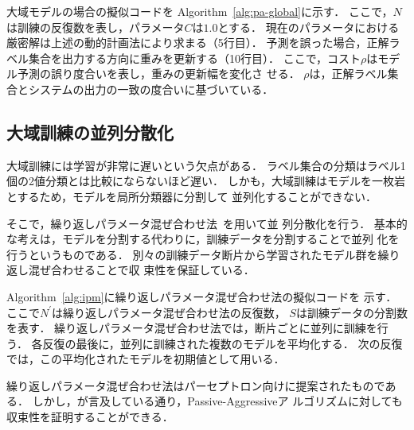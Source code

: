 \documentclass[japanese]{jnlp_1.4}
\begin{document}
大域モデルの場合の擬似コードを Algorithm~\ref{alg:pa-global}に示す．
ここで，$N$は訓練の反復数を表し，パラメータ$C$は$1.0$とする．
現在のパラメータにおける厳密解は上述の動的計画法により求まる（5行目）．
予測を誤った場合，正解ラベル集合を出力する方向に重みを更新する（10行目）．
ここで，コスト$\rho$はモデル予測の誤り度合いを表し，重みの更新幅を変化さ
せる．
$\rho$は，正解ラベル集合とシステムの出力の一致の度合いに基づいている．



\subsection{大域訓練の並列分散化}
\label{sec:proposed-parallel}

大域訓練には学習が非常に遅いという欠点がある．
ラベル集合の分類はラベル1個の2値分類とは比較にならないほど遅い．
しかも，大域訓練はモデルを一枚岩とするため，モデルを局所分類器に分割して
並列化することができない．

そこで，繰り返しパラメータ混ぜ合わせ法~\cite{McDonald2010full}を用いて並
列分散化を行う．
基本的な考えは，モデルを分割する代わりに，訓練データを分割することで並列
化を行うというものである．
別々の訓練データ断片から学習されたモデル群を繰り返し混ぜ合わせることで収
束性を保証している．

Algorithm~\ref{alg:ipm}に繰り返しパラメータ混ぜ合わせ法の擬似コードを
示す．
ここで$N^\prime$は繰り返しパラメータ混ぜ合わせ法の反復数，
$S$は訓練データの分割数を表す．
繰り返しパラメータ混ぜ合わせ法では，断片ごとに並列に訓練を行う．
各反復の最後に，並列に訓練された複数のモデルを平均化する．
次の反復では，この平均化されたモデルを初期値として用いる．

繰り返しパラメータ混ぜ合わせ法はパーセプトロン向けに提案されたものである．
しかし，\cite{McDonald2010full}が言及している通り，Passive-Aggressiveア
ルゴリズムに対しても収束性を証明することができる．
\end{document}

